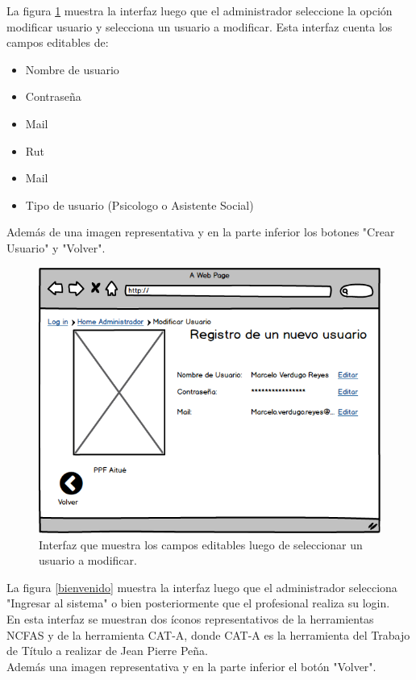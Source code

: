 \clearpage
\newpage

La figura \ref{moduser} muestra la interfaz luego que el administrador seleccione la opción modificar usuario y selecciona un usuario a modificar. Esta interfaz cuenta los campos editables de:
\begin{itemize}
	\item Nombre de usuario
	\item Contraseña
	\item Mail
	\item Rut
	\item Mail
	\item Tipo de usuario (Psicologo o Asistente Social)
\end{itemize}

Además de una imagen representativa y en la parte inferior  los botones "Crear Usuario" y "Volver".\\

\begin{figure}[htb]
	\label{moduser}
	\begin{center}
		\includegraphics[scale=0.5]{imagenes/moduser.png}
	\end{center}
	\caption{Interfaz que muestra los campos editables luego de seleccionar un usuario a modificar.}
\end{figure}

\clearpage
\newpage

La figura \ref{bienvenido} muestra la interfaz luego que el administrador selecciona "Ingresar al sistema" o bien posteriormente que el profesional realiza su login.\\
En esta interfaz se muestran dos íconos representativos de la herramientas NCFAS y de la herramienta CAT-A, donde CAT-A es la herramienta del Trabajo de Título a realizar de Jean Pierre Peña. \\
Además una imagen representativa y en la parte inferior el botón "Volver".\\

